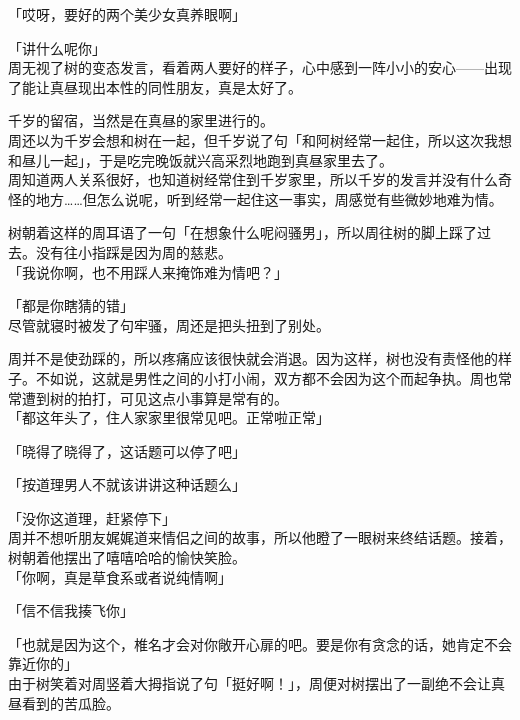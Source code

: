 「哎呀，要好的两个美少女真养眼啊」

「讲什么呢你」\\

周无视了树的变态发言，看着两人要好的样子，心中感到一阵小小的安心——出现了能让真昼现出本性的同性朋友，真是太好了。\\

\vspace{2\baselineskip}

千岁的留宿，当然是在真昼的家里进行的。\\

周还以为千岁会想和树在一起，但千岁说了句「和阿树经常一起住，所以这次我想和昼儿一起」，于是吃完晚饭就兴高采烈地跑到真昼家里去了。\\

周知道两人关系很好，也知道树经常住到千岁家里，所以千岁的发言并没有什么奇怪的地方……但怎么说呢，听到经常一起住这一事实，周感觉有些微妙地难为情。

树朝着这样的周耳语了一句「在想象什么呢闷骚男」，所以周往树的脚上踩了过去。没有往小指踩是因为周的慈悲。\\

「我说你啊，也不用踩人来掩饰难为情吧？」

「都是你瞎猜的错」\\

尽管就寝时被发了句牢骚，周还是把头扭到了别处。

周并不是使劲踩的，所以疼痛应该很快就会消退。因为这样，树也没有责怪他的样子。不如说，这就是男性之间的小打小闹，双方都不会因为这个而起争执。周也常常遭到树的拍打，可见这点小事算是常有的。\\

「都这年头了，住人家家里很常见吧。正常啦正常」

「晓得了晓得了，这话题可以停了吧」

「按道理男人不就该讲讲这种话题么」

「没你这道理，赶紧停下」\\

周并不想听朋友娓娓道来情侣之间的故事，所以他瞪了一眼树来终结话题。接着，树朝着他摆出了嘻嘻哈哈的愉快笑脸。\\

「你啊，真是草食系或者说纯情啊」

「信不信我揍飞你」

「也就是因为这个，椎名才会对你敞开心扉的吧。要是你有贪念的话，她肯定不会靠近你的」\\

由于树笑着对周竖着大拇指说了句「挺好啊！」，周便对树摆出了一副绝不会让真昼看到的苦瓜脸。

